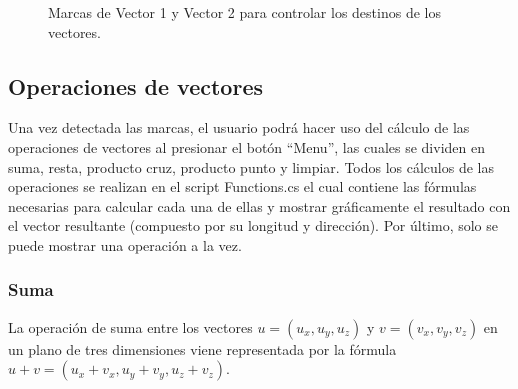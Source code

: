 \begin{figure}[hbt!]
\centering
{}
\caption{\label{fig:vec_vectores}Marcas de Vector 1 y Vector 2 para controlar los destinos de los vectores.}
\end{figure}
\FloatBarrier


\subsection{Operaciones de vectores}
Una vez detectada las marcas, el usuario podrá hacer uso del cálculo de las operaciones de vectores al presionar el botón “Menu”, las cuales se dividen en suma, resta, producto cruz, producto punto y limpiar. Todos los cálculos de las operaciones se realizan en el script Functions.cs el cual contiene las fórmulas necesarias para calcular cada una de ellas y mostrar gráficamente el resultado con el vector resultante (compuesto por su longitud y dirección). Por último, solo se puede mostrar una operación a la vez.

\subsubsection{Suma}
La operación de suma entre los vectores $u=(u_x,u_y,u_z)$ y $v=(v_x,v_y,v_z)$ en un plano de tres dimensiones viene representada por la fórmula $u + v = (u_x+v_x, u_y+v_y, u_z+v_z)$.

